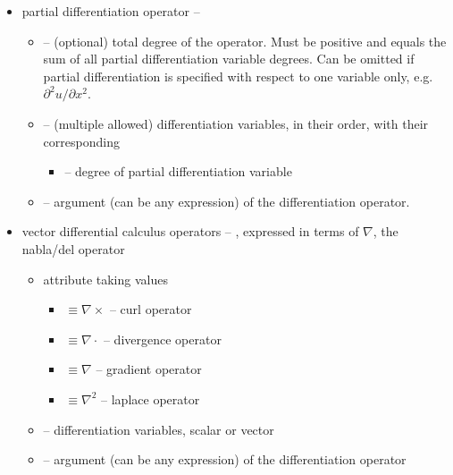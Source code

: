 \begin{itemize}
\item 
partial differentiation operator -- 
\begin{itemize}
\item 
{} -- (optional) total degree of the operator. Must be positive 
and equals the sum of all partial differentiation variable degrees. Can be omitted 
if partial differentiation is specified with respect to one variable only, e.g. $\partial^2 u / \partial x^2$.
\item
{} -- (multiple allowed) differentiation variables, in their order, with their corresponding 
\begin{itemize}
\item 
{} -- degree of partial differentiation variable
\end{itemize}
\item
{} -- argument (can be any expression) of the differentiation operator.
\end{itemize}
\item
vector differential calculus operators -- , expressed 
in terms of $\nabla$,  the nabla/del operator
\begin{itemize}
\item 
 attribute  taking values
\begin{itemize}
\item 
{} $\equiv \nabla \times $ -- curl operator
\item 
{} $\equiv \nabla \cdot $  -- divergence operator
\item 
{} $\equiv \nabla $  -- gradient operator
\item 
{}  $\equiv \nabla^2 $  -- laplace operator
\end{itemize}
\item
{} -- differentiation variables, scalar or vector
\item
{} -- argument (can be any expression) of the differentiation operator
\end{itemize}


\end{itemize}
